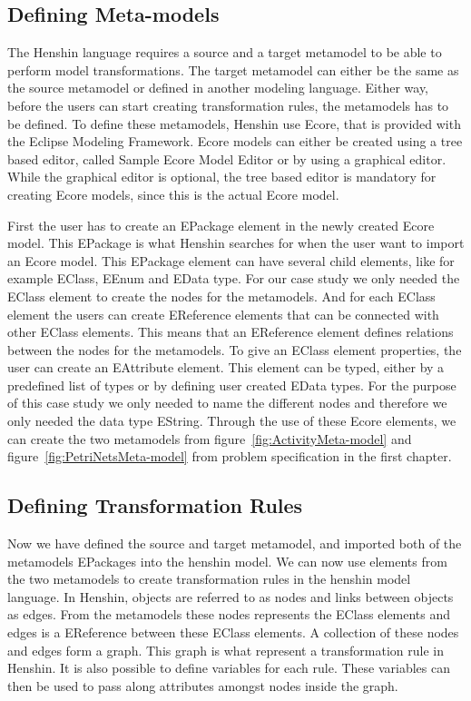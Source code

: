 \subsection{Defining Meta-models}

The Henshin language requires a source and a target metamodel to be able to
perform model transformations. The target metamodel can either be the same as
the source metamodel or defined in another modeling language. Either way, before
the users can start creating transformation rules, the metamodels has
to be defined. To define these metamodels, Henshin use Ecore, that is
provided with the Eclipse Modeling Framework\cite{Steinberg2009}. Ecore models
can either be created using a tree based editor, called Sample Ecore Model
Editor or by using a graphical editor. While the graphical editor is optional,
the tree based editor is mandatory for creating Ecore models, since this is the
actual Ecore model. 

First the user has to create an EPackage element in the newly created Ecore
model. This EPackage is what Henshin searches for when the user want to import
an Ecore model. This EPackage element can have several child elements, like for
example EClass, EEnum and EData type. For our case study we only needed the
EClass element to create the nodes for the metamodels. And for each EClass
element the users can create EReference elements that can be connected with
other EClass elements. This means that an EReference element defines relations
between the nodes for the metamodels. To give an EClass element properties, the
user can create an EAttribute element. This element can be typed, either by a
predefined list of types or by defining user created EData types. For the
purpose of this case study we only needed to name the different nodes and
therefore we only needed the data type EString. Through the use of these Ecore
elements, we can create the two metamodels from
figure~\ref{fig:ActivityMeta-model} and figure~\ref{fig:PetriNetsMeta-model} from
problem specification in the first chapter.


\subsection{Defining Transformation Rules}

Now we have defined the source and target metamodel, and imported
both of the metamodels EPackages into the henshin model. We can now use elements
from the two metamodels to create transformation rules in the henshin model
language. In Henshin, objects are referred to as nodes and links between objects
as edges. From the metamodels these nodes represents the EClass elements and
edges is a EReference between these EClass elements. A collection of these nodes
and edges form a graph. This graph is what represent a transformation rule in
Henshin. It is also possible to define variables for each rule. These variables
can then be used to pass along attributes amongst nodes inside the
graph. 

